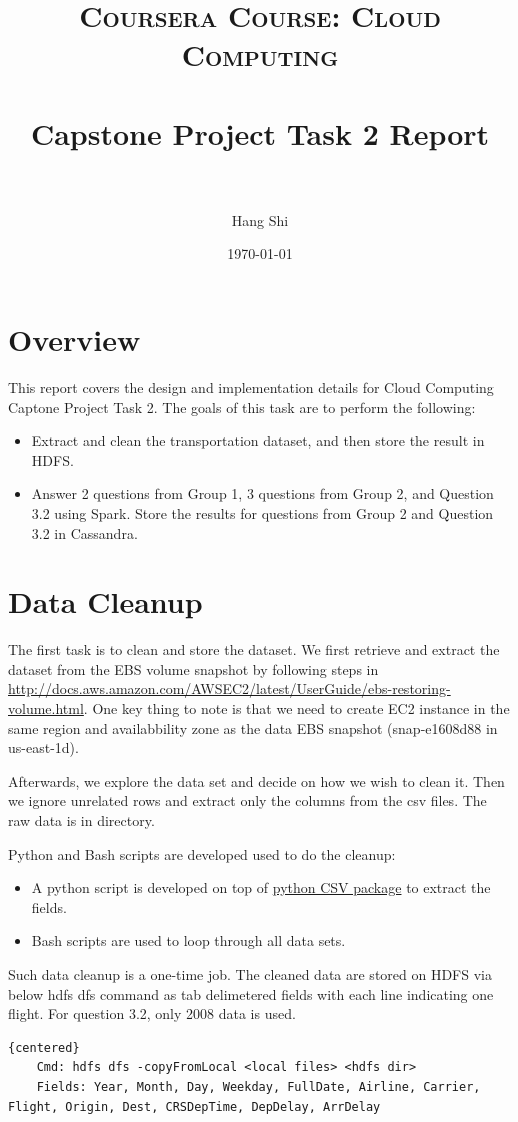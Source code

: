 \documentclass[fontsize=11pt,paper=a4]{scrartcl}
\title{
		\usefont{OT1}{bch}{b}{n}
		\normalfont \normalsize \textsc
		{Coursera Course: Cloud Computing} \\ [25pt]
		\horrule{0.5pt} \\[0.4cm]
		\huge Capstone Project Task 2 Report \\
		\horrule{2pt} \\[0.5cm]
}
\author{
		\normalfont 	\normalsize
        Hang Shi\\[-3pt] \normalsize        
}
\date{\today}
\begin{document}
\maketitle
		
\section{Overview}
This report covers the design and implementation details for Cloud Computing Captone Project Task 2. The goals of this task are to perform the following:
\begin{itemize}
\item Extract and clean the transportation dataset, and then store the result in HDFS.
\item Answer 2 questions from Group 1, 3 questions from Group 2, and Question 3.2 using Spark. Store the results for questions from Group 2 and Question 3.2 in Cassandra.   
\end{itemize} 
\section{Data Cleanup}
The first task is to clean and store the dataset. We  first retrieve and extract the dataset from the EBS volume snapshot by following steps in \url{http://docs.aws.amazon.com/AWSEC2/latest/UserGuide/ebs-restoring-volume.html}. One key thing to note is that we need to create EC2 instance in the same region and availabbility zone as the data EBS snapshot (snap-e1608d88 in us-east-1d).   

Afterwards, we explore the data set and decide on how we wish to clean it. Then we ignore unrelated rows and extract only the columns from the csv files. The raw data is in  directory. 

Python and Bash scripts are developed used to do the cleanup: 
\begin{itemize} 
\item A python script is developed on top of \href{https://docs.python.org/2/library/csv.html}{python CSV package} to extract the fields. 
\item Bash scripts are used to loop through all data sets. 
\end{itemize}

Such data cleanup is a one-time job. The cleaned data are stored on HDFS via below hdfs dfs command  as tab delimetered fields with each line indicating one flight. For question 3.2, only 2008 data is used. 
\begin{lstlisting}{centered}
	Cmd: hdfs dfs -copyFromLocal <local files> <hdfs dir>  
	Fields: Year, Month, Day, Weekday, FullDate, Airline, Carrier, Flight, Origin, Dest, CRSDepTime, DepDelay, ArrDelay
\end{lstlisting}
\end{document}
